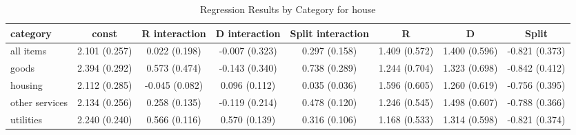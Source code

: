 \begin{table}[H]
\caption{Regression Results by Category for house}
\label{tab:regression_results}
\begin{tabular}{lccccccc}
\toprule
category & const & R interaction & D interaction & Split interaction & R & D & Split \\
\midrule
all items & 2.101 (0.257) & 0.022 (0.198) & -0.007 (0.323) & 0.297 (0.158) & 1.409 (0.572) & 1.400 (0.596) & -0.821 (0.373) \\
goods & 2.394 (0.292) & 0.573 (0.474) & -0.143 (0.340) & 0.738 (0.289) & 1.244 (0.704) & 1.323 (0.698) & -0.842 (0.412) \\
housing & 2.112 (0.285) & -0.045 (0.082) & 0.096 (0.112) & 0.035 (0.036) & 1.596 (0.605) & 1.260 (0.619) & -0.756 (0.395) \\
other services & 2.134 (0.256) & 0.258 (0.135) & -0.119 (0.214) & 0.478 (0.120) & 1.246 (0.545) & 1.498 (0.607) & -0.788 (0.366) \\
utilities & 2.240 (0.240) & 0.566 (0.116) & 0.570 (0.139) & 0.316 (0.106) & 1.168 (0.533) & 1.314 (0.598) & -0.821 (0.374) \\
\bottomrule
\end{tabular}
\end{table}
